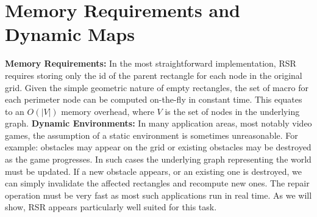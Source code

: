\section{Memory Requirements and Dynamic Maps}
\label{sec:memory}
\textbf{Memory Requirements: }
In the most straightforward implementation, RSR requires storing only the id of the
parent rectangle for each node in the original grid. 
Given the simple geometric nature of empty rectangles, the set of macro
for each perimeter node can be computed on-the-fly in constant time. 
This equates to an $O(|V|)$ memory overhead, where $V$ is the set of nodes
in the underlying graph.
\newline \noindent
\textbf{Dynamic Environments: }
In many application areas, most notably video games, the assumption of a static 
environment is sometimes unreasonable.
For example: obstacles may appear on the grid or existing obstacles may be
destroyed as the game progresses.
In such cases the underlying graph representing the world must be updated.
If a new obstacle appears, or an existing one is destroyed,
we can simply invalidate the affected rectangles and recompute new ones.
The repair operation must be very fast as most such applications run in real
time. As we will show, RSR appears particularly well suited for this task.
